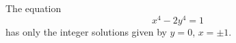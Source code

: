 \begin{proposition}\label{eq:132}
    The equation
\[
    x^4-2y^4=1
\]
    has only the integer solutions given by $y=0$, $x=\pm1$.
\end{proposition}
